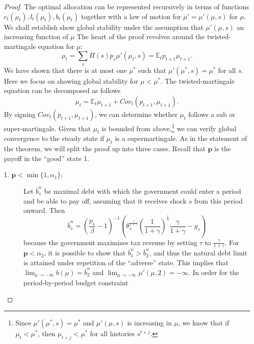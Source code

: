 \documentclass[12pt]{article}
\newcommand{\dge}[1]{\textcolor{blue}{$^{\textrm{dge}}${#1}}}
\newcommand{\tjs}[1]{\textcolor{red}{$^{\textrm{tjs}}${#1}}}
\newcommand{\EE}{\mathbb E}
\begin{document}
\begin{proof}
The optimal allocation can be represented recursively in terms of  functions $c_t(\mu_t),l_t(\mu_t), b_t(\mu_t)$ together  with a law of motion for $\mu' = \mu'(\mu,s)$ for $\mu$.
We shall establish show global stability under the assumption that $\mu'(\mu,s)$ an increasing function of $\mu$
The heart of the proof revolves around the twisted-martingale equation for $\mu$:
\[
	\mu_t = \sum_s \Pi(s) p_s \mu'(\mu_t,s) = \EE_t p_{t+1}\mu_{t+1}.
\]  We have shown that there is at most one $\mu^*$ such that $\mu'(\mu^*,s) = \mu^*$ for all $s$.  Here we focus on showing global stability for $\mu < \mu^*$. The twisted-martingale equation can be decomposed as follows
\[
	\mu_t = \EE_t \mu_{t+1}+Cov_t(p_{t+1},\mu_{t+1}).
\] By signing $Cov_t(p_{t+1},\mu_{t+1})$,  we can determine whether $\mu_t$ follows a sub or super-martingale.  Given that $\mu_t$ is bounded from above,\footnote{Since  $\mu'(\mu^*,s) = \mu^*$ and $\mu'(\mu,s)$ is increasing in $\mu$,  we know that if $\mu_t < \mu^*$, then $\mu_{t+j} < \mu^*$ for all histories $s^{t+j}$.} we can verify global convergence to the steady state if $\mu_t$ is a supermartingale.  As in the statement of the theorem, we will split the proof up into three cases. Recall that $\bm p$ is the payoff in the ``good'' state 1.
\begin{description}
	\item[1. $\bm p < \min\{1,\alpha_1\}$:]  Let $\overline b^n_s$ be maximal debt with which the government %
 could enter a period and be able to pay off, assuming that  it  receives shock $s$ from this period onward. Then
	\[
	\overline b^n_s = \left(\frac{p_s}{\beta}-1\right)^{-1}\left(\theta_s^\frac{\gamma}{1+\gamma}\left(\frac1{1+\gamma}\right)^\frac1\gamma\frac\gamma{1+\gamma}-g_s\right)
	\] because the government maximizes tax revenue  by setting %
 $\tau$ to $\frac\gamma{1+\gamma}$. %
 For $\bm p <\alpha_2$, it is possible to show that $\overline b^n_1 > \overline b^n_2$, and thus the natural debt limit is attained under repetition of the ``adverse'' state.  This implies that $\lim_{\mu\rightarrow-\infty} b(\mu) = \overline b^n_2$ and  $\lim_{\mu\rightarrow-\infty} \mu'(\mu,2) = -\infty$.  In order for the period-by-period budget constraint

\end{description}
\end{proof}
\end{document}
